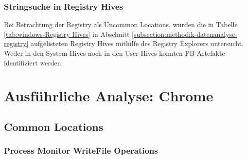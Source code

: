 \begin{appendices}

\subsubsection*{Stringsuche in Registry Hives}
Bei Betrachtung der Registry als Uncommon Locations, wurden die in Tabelle \ref{tab:windows-Registry Hives} in Abschnitt \ref{subsection:methodik-datenanalyse-registry} aufgelisteten Registry Hives mithilfe des Registry Explorers untersucht. 
Weder in den System-Hives noch in den User-Hives konnten PB-Artefakte identifiziert werden. 


	

\pagebreak

\section{Ausführliche Analyse: Chrome}\label{chap:anhang-chrome}
\subsection{Common Locations}\label{chap:anhang-chrome-common-locations}
\subsubsection*{Process Monitor WriteFile Operations}\label{chap:anhang-chrome-common-locations-writefile-operations}


\end{appendices}
